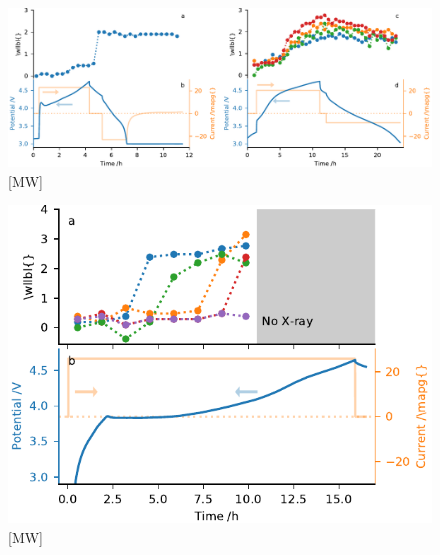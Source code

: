 \documentclass{article}
\begin{document}
\begin{figure}
  \includegraphics{figures/NCA-particle-echem.pdf}
  \caption{[MW] }
\end{figure}

\begin{figure}
  \includegraphics{figures/NMC532-particle-echem.pdf}
  \caption{[MW] }
\end{figure}
\end{document}
